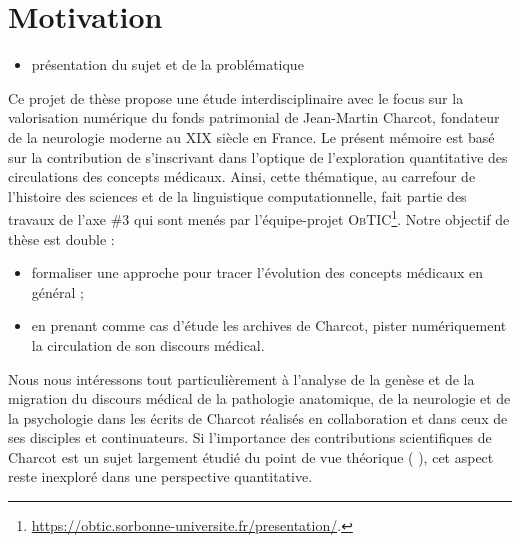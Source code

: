 \minitoc%


\section{Motivation}
\begin{itemize}
\item présentation du sujet et de la problématique
\end{itemize}

Ce projet de thèse propose une étude interdisciplinaire avec le focus sur la valorisation numérique du fonds patrimonial de Jean-Martin Charcot, fondateur de la neurologie moderne au XIX\ieme{} siècle en France.
Le présent mémoire est basé sur la contribution de \citet{petkovic2023circulation} s'inscrivant dans l'optique de l'exploration quantitative des circulations des concepts médicaux. Ainsi, cette thématique, au carrefour de l'histoire des sciences et de la linguistique computationnelle, fait partie des travaux de l'axe \#3 qui sont menés par l'équipe-projet \textsc{ObTIC}\footnote{\url{https://obtic.sorbonne-universite.fr/presentation/}.}. 
Notre objectif de thèse est double :
\begin{itemize} 
\item formaliser une approche pour tracer l'évolution des concepts médicaux en général ;
\item en prenant comme cas d'étude les archives de Charcot, pister numériquement la circulation de son discours médical.
\end{itemize}

Nous nous intéressons tout particulièrement à l'analyse de la genèse et de la migration du discours médical de la pathologie anatomique, de la neurologie et de la psychologie dans les écrits de Charcot réalisés en collaboration et dans ceux de ses disciples et continuateurs. Si l'importance des contributions scientifiques de Charcot est un sujet largement étudié du point de vue théorique (\citealp{bogousslavsky2011following,broussolle2012,camargo2024} ), cet aspect reste inexploré dans une perspective quantitative.

